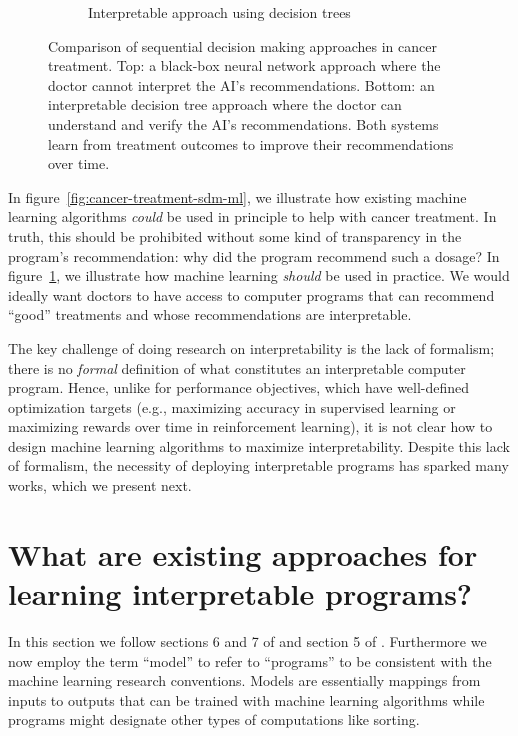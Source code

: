 \begin{figure}[htbp]
\begin{subfigure}[b]{0.7\textwidth}
\begin{tikzpicture}
        \end{tikzpicture}
        \caption{Interpretable approach using decision trees}
        \label{fig:cancer-treatment-comparison}
    \end{subfigure}
    \caption{Comparison of sequential decision making approaches in cancer treatment. Top: a black-box neural network approach where the doctor cannot interpret the AI's recommendations. Bottom: an interpretable decision tree approach where the doctor can understand and verify the AI's recommendations. Both systems learn from treatment outcomes to improve their recommendations over time.}
    \label{fig:cancer-treatment-comparison-combined}
\end{figure}

In figure~\ref{fig:cancer-treatment-sdm-ml}, we illustrate how existing machine learning algorithms \textit{could} be used in principle to help with cancer treatment. In truth, this should be prohibited without some kind of transparency in the program's recommendation: why did the program recommend such a dosage?
In figure~\ref{fig:cancer-treatment-comparison}, we illustrate how machine learning \textit{should} be used in practice. We would ideally want doctors to have access to computer programs that can recommend ``good'' treatments and whose recommendations are interpretable. 

The key challenge of doing research on interpretability is the lack of formalism; there is no \textit{formal} definition of what constitutes an interpretable computer program. Hence, unlike for performance objectives, which have well-defined optimization targets (e.g., maximizing accuracy in supervised learning or maximizing rewards over time in reinforcement learning), it is not clear how to design machine learning algorithms to maximize interpretability. 
Despite this lack of formalism, the necessity of deploying interpretable programs has sparked many works, which we present next.
\section{What are existing approaches for learning interpretable programs?}

In this section we follow sections 6 and 7 of \cite{glanois-survey} and section 5 of \cite{milani-survey}. 
Furthermore we now employ the term ``model'' to refer to ``programs'' to be consistent with the machine learning research conventions.
Models are essentially mappings from inputs to outputs that can be trained with machine learning algorithms while programs might designate other types of computations like sorting.

